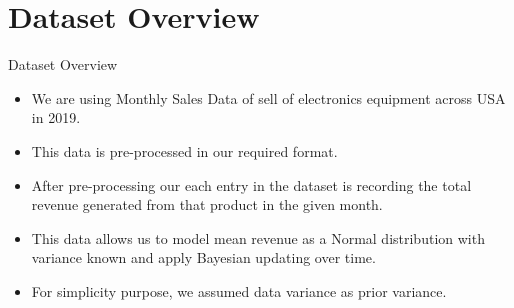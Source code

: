 \section{Dataset Overview}

\begin{frame}{Dataset Overview}

  \begin{itemize}

    \item We are using Monthly Sales Data of sell of electronics equipment across USA in 2019.
    \item This data is pre-processed in our required format.
    \item After pre-processing our each entry in the dataset is recording the total revenue generated from that product in the given month.
    \item This data allows us to model mean revenue as a Normal distribution with variance known and apply Bayesian updating over time.
    \item For simplicity purpose, we assumed data variance as prior variance.
  \end{itemize}
  
\end{frame}
